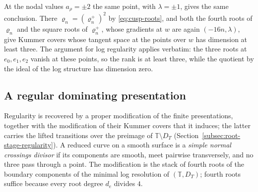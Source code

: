 At the nodal values $a_\rho=\pm2$ the same point, with $\lambda=\pm1$, gives the same
conclusion.  There $\varrho_n=(\varrho_n^+)^2$ by \eqref{eq:cusp-roots}, and
both the fourth roots of $\varrho_n$ and the square roots of $\varrho_n^+$,
whose gradients at $w$ are again $(-16n,\lambda)$, give Kummer covers whose
tangent space at the points over $w$ has dimension at least three.  The
argument for log regularity applies verbatim: the three roots at
$e_0,e_1,e_2$ vanish at these points, so the rank is at least three, while
the quotient by the ideal of the log structure has dimension zero.

\subsection{A regular dominating presentation}

Regularity is recovered by a proper modification of the finite
presentations, together with the modification of their Kummer covers that
it induces; the latter carries the lifted transitions over the preimage of
$\mathbb T\setminus D_T$ (Section~\ref{subsec:root-stage-regularity}).  A
reduced curve on a smooth surface is a \emph{simple normal crossings
divisor} if its components are smooth, meet pairwise
transversely, and no three pass through a point.  The modification is the
stack of fourth roots of the boundary components of the minimal log
resolution of $(\mathbb T,D_T)$; fourth roots suffice because every root
degree $d_e$ divides $4$.

